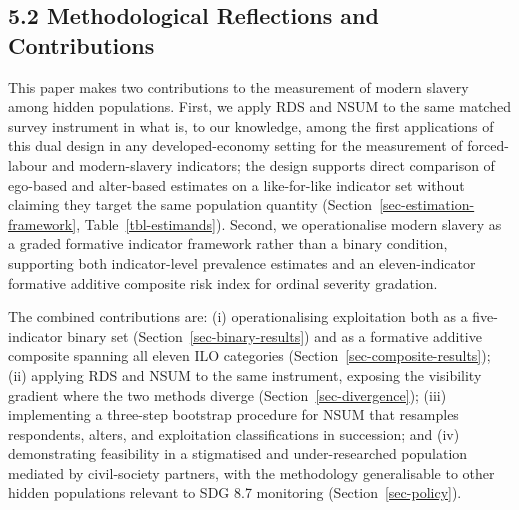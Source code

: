 \documentclass[
  12pt,
  letterpaper,
  DIV=11,
  numbers=noendperiod]{scrartcl}
\begin{document}
\subsection{5.2 Methodological Reflections and
Contributions}\label{sec-contributions}

This paper makes two contributions to the measurement of modern slavery
among hidden populations. First, we apply RDS and NSUM to the same
matched survey instrument in what is, to our knowledge, among the first
applications of this dual design in any developed-economy setting for
the measurement of forced-labour and modern-slavery indicators; the
design supports direct comparison of ego-based and alter-based estimates
on a like-for-like indicator set without claiming they target the same
population quantity (Section~\ref{sec-estimation-framework},
Table~\ref{tbl-estimands}). Second, we operationalise modern slavery as
a graded formative indicator framework rather than a binary condition,
supporting both indicator-level prevalence estimates and an
eleven-indicator formative additive composite risk index for ordinal
severity gradation.

The combined contributions are: (i) operationalising exploitation both
as a five-indicator binary set (Section~\ref{sec-binary-results}) and as
a formative additive composite spanning all eleven ILO categories
(Section~\ref{sec-composite-results}); (ii) applying RDS and NSUM to the
same instrument, exposing the visibility gradient where the two methods
diverge (Section~\ref{sec-divergence}); (iii) implementing a three-step
bootstrap procedure for NSUM that resamples respondents, alters, and
exploitation classifications in succession; and (iv) demonstrating
feasibility in a stigmatised and under-researched population mediated by
civil-society partners, with the methodology generalisable to other
hidden populations relevant to SDG 8.7 monitoring
(Section~\ref{sec-policy}).
\end{document}
